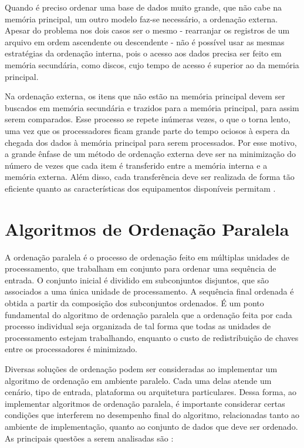Quando é preciso ordenar uma base de dados muito grande, que não cabe na memória principal, um outro modelo faz-se necessário, a ordenação externa.
Apesar do problema nos dois casos ser o mesmo - rearranjar os registros de um arquivo em ordem ascendente ou descendente - não é possível usar as mesmas estratégias da ordenação interna, pois o acesso aos dados precisa ser feito em memória secundária, como discos, cujo tempo de acesso é superior ao da memória principal.  %

Na ordenação externa, os itens que não estão na memória principal devem ser buscados em memória secundária e trazidos para a memória principal, para assim serem comparados. Esse processo se repete inúmeras vezes, o que o torna lento, uma vez que os processadores ficam grande parte do tempo ociosos à espera da chegada dos dados à memória principal para serem processados. Por esse motivo, a grande ênfase de um método de ordenação externa deve ser na minimização do número de vezes que cada item é transferido entre a memória interna e a memória externa. Além disso, cada transferência deve ser realizada de forma tão eficiente quanto as características dos equipamentos disponíveis permitam \cite{Ziviani:2007}.



\section{Algoritmos de Ordenação Paralela}

A ordenação paralela é o processo  de ordenação feito em múltiplas unidades de processamento, que trabalham em conjunto para ordenar uma sequência de entrada. O conjunto inicial é dividido em subconjuntos disjuntos, que são associados a uma única unidade de processamento. A sequência final ordenada é obtida a partir da composição dos subconjuntos ordenados. É um ponto fundamental do algoritmo de ordenação paralela que a ordenação feita por cada processo individual seja organizada de tal forma que todas as unidades de processamento estejam trabalhando, enquanto o custo de redistribuição de chaves entre os processadores é minimizado. 

 
Diversas soluções de ordenação podem ser consideradas ao implementar um algoritmo de ordenação em ambiente paralelo. Cada uma delas atende um cenário, tipo de entrada, plataforma ou arquitetura particulares. Dessa forma, ao implementar algoritmos de ordenação paralela, é importante considerar certas condições que interferem no desempenho final do algoritmo, relacionadas tanto ao ambiente de implementação, quanto ao conjunto de dados que deve ser ordenado. As principais questões a serem analisadas são \cite{Kale:2010}:

